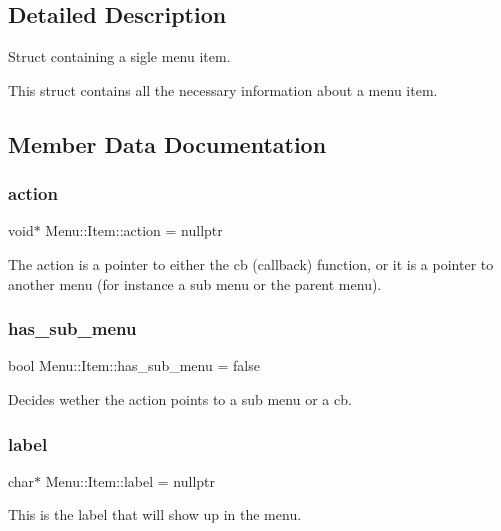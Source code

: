 \subsection{Detailed Description}
Struct containing a sigle menu item. 

This struct contains all the necessary information about a menu item. 

\subsection{Member Data Documentation}
\hypertarget{struct_menu_1_1_item_a247e140fed2addf80986ba5a3506b9dd}{}\label{struct_menu_1_1_item_a247e140fed2addf80986ba5a3506b9dd} 
\subsubsection{\texorpdfstring{action}{action}}
{\footnotesize\ttfamily void$\ast$ Menu\+::\+Item\+::action = nullptr}

The action is a pointer to either the cb (callback) function, or it is a pointer to another menu (for instance a sub menu or the parent menu). \hypertarget{struct_menu_1_1_item_a5c9895a137458b9a12dafd447ac7430b}{}\label{struct_menu_1_1_item_a5c9895a137458b9a12dafd447ac7430b} 
\subsubsection{\texorpdfstring{has\+\_\+sub\+\_\+menu}{has\_sub\_menu}}
{\footnotesize\ttfamily bool Menu\+::\+Item\+::has\+\_\+sub\+\_\+menu = false}

Decides wether the action points to a sub menu or a cb. \hypertarget{struct_menu_1_1_item_a378723382fc64c752a85ffe6fec9707e}{}\label{struct_menu_1_1_item_a378723382fc64c752a85ffe6fec9707e} 
\subsubsection{\texorpdfstring{label}{label}}
{\footnotesize\ttfamily char$\ast$ Menu\+::\+Item\+::label = nullptr}

This is the label that will show up in the menu. \hypertarget{struct_menu_1_1_item_a46749d046bbbde8d5308848d5394c2dc}{}\label{struct_menu_1_1_item_a46749d046bbbde8d5308848d5394c2dc} 
